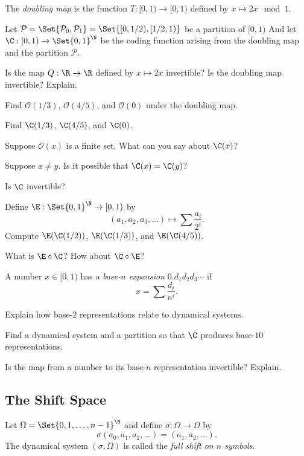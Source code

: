 	The \emph{doubling map} is the function $T:[0,1)\to[0,1)$ defined by $x\mapsto 2x\mod 1$.

	\question
	Let $\mathcal P=\Set{\mathcal P_0,\mathcal P_1} = \Set{[0,1/2),[1/2,1)}$ be a partition of $[0,1)$
	And let $\C:[0,1)\to\Set{0,1}^\N$ be the coding function arising from the doubling map and the partition $\mathcal P$.
	\begin{parts}
		\item Is the map $Q:\R\to\R$ defined by $x\mapsto 2x$ invertible? Is the doubling map invertible? Explain.
		\item Find $\mathcal O(1/3)$, $\mathcal O(4/5)$, and $\mathcal O(0)$ under the doubling map.
		\item Find $\C(1/3)$, $\C(4/5)$, and $\C(0)$.
		\item Suppose $\mathcal O(x)$ is a finite set. What can you say about $\C(x)$?
		\item Suppose $x\neq y$. Is it possible that $\C(x)=\C(y)$?
		\item Is $\C$ invertible?
		\item Define $\E:\Set{0,1}^\N\to[0,1)$ by \[
				(a_1,a_2,a_3,\ldots)\mapsto \sum \frac{a_i}{2^i}.
				\]
		Compute $\E(\C(1/2))$,  $\E(\C(1/3))$, and $\E(\C(4/5))$.
		\item What is $\E\circ \C$? How about $\C\circ \E$?
	\end{parts}

	\begin{definition}
		A number $x\in [0,1)$ has a \emph{base-$n$ expansion} $0.d_1d_2d_3\cdots$ if
		\[
			x=\sum \frac{d_i}{n^i}.
		\]
	\end{definition}

	\question
	\begin{parts}
		\item Explain how base-$2$ representations relate to dynamical systems.
		\item Find a dynamical system and a partition so that $\C$ produces base-$10$ representations.
		\item Is the map from a number to its base-$n$ representation invertible? Explain.
	\end{parts}


	\newpage
	\subsection*{The Shift Space}

	\begin{definition}
		Let $\Omega=\Set{0,1,\ldots,n-1}^\N$ and define $\sigma:\Omega\to\Omega$ by
		\[
			\sigma(a_0,a_1,a_2,\ldots) = (a_1,a_2,\ldots).
		\]
		The dynamical system $(\sigma, \Omega)$ is called
		the \emph{full shift on $n$ symbols}. 
	\end{definition}


